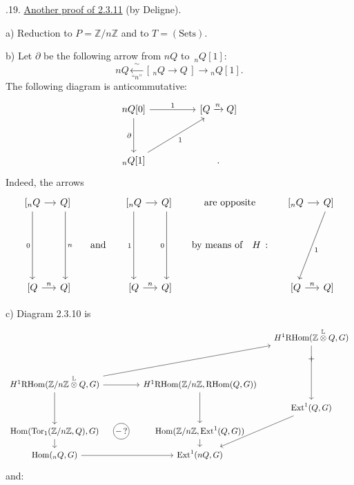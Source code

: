 
\medskip
{}.19.  \underline{Another proof of 2.3.11} (by
Deligne).

\medskip
\noindent a) Reduction to $P=\mathbb Z/n\mathbb Z$ and to
$T=(\mathrm{Sets})$.

\medskip
\noindent b) Let $\partial$ be the following arrow from $nQ$ to
$\,{}_nQ[1]$:
\[
 nQ\xleftarrow[\text{``$n$''}]{\ \sim\ }
 [\,{}_nQ\longrightarrow Q\,]
 \longrightarrow{}_nQ[1].
\]
The following diagram is anticommutative:
\[
\begin{tikzcd}[row sep=huge,column sep=huge]
 nQ[0]\arrow[r,"1"]\arrow[d,"\partial"']
   &{[Q\xrightarrow{n}Q]}\\
 {}_nQ[1]\arrow[ru,"1"']&{.}
\end{tikzcd}
\]
Indeed, the arrows
\[
\begin{tikzcd}[column sep=small,row sep=large]
 {[{}_nQ}\arrow[r]\arrow[dd,"0"']&{Q]}\arrow[dd,"n"]
   &&{[{}_nQ}\arrow[r]\arrow[dd,"1"']&{Q]}\arrow[dd,"0"']
   &\text{are opposite}
   &{[{}_nQ}\arrow[r]&{Q]}\arrow[ddl,"1"]\\
 &&\text{and}&&&\text{by means of}\quad H\,:&&\\
 {[Q}\arrow[r,"n"]&{Q]}&&{[Q}\arrow[r,"n"]&{Q]}
   &&{[Q}\arrow[r,"n"]&{Q]}
\end{tikzcd}
\]

\medskip
\noindent c) Diagram 2.3.10 is
\[
\begin{tikzcd}[column sep=small,row sep=small]
 &&&H^1\mathrm{RHom}
   (\mathbb Z\mathbin{\overset{\mathbb L}{\otimes}}Q,G)
   \arrow[ddd]\\
 &&&+\\
 H^1\mathrm{RHom}
   (\mathbb Z/n\mathbb Z\mathbin{\overset{\mathbb L}{\otimes}}Q,G)
   \arrow[rr]\arrow[dd]\arrow[uurrr]
 &&H^1\mathrm{RHom}
   (\mathbb Z/n\mathbb Z,\mathrm{RHom}(Q,G))
   \arrow[dd]&\\
 &&&\mathrm{Ext}^1(Q,G)\arrow[ddl]\\
 \mathrm{Hom}(\mathrm{Tor}_1(\mathbb Z/n\mathbb Z,Q),G)\arrow[d]
 &|[draw,circle,inner sep=1pt]|{-\,?}
 &\mathrm{Hom}(\mathbb Z/n\mathbb Z,\mathrm{Ext}^1(Q,G))
   \arrow[d]&\\
 \mathrm{Hom}({}_nQ,G)\arrow[rr]
 &&\mathrm{Ext}^1(nQ,G)&
\end{tikzcd}
\]
and:

